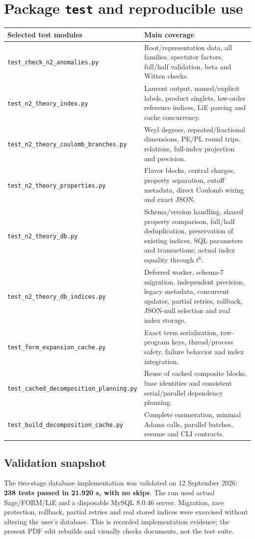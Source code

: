 \documentclass[11pt,a4paper]{article}
\numberwithin{equation}{section}
\newcommand{\code}[1]{{\small\nolinkurl{#1}}}
\begin{document}
\clearpage


\clearpage
\section{Package \texttt{test} and reproducible use}\label{sec:test}
\begingroup\small
{\small
\begin{tabularx}{\textwidth}{@{}p{72mm}Y@{}}
\toprule Selected test modules & Main coverage\\\midrule
\code{test_check_n2_anomalies.py} & Root/representation data, all families,
spectator factors, full/half validation, beta and Witten checks.\\
\code{test_n2_theory_index.py} & Laurent output, named/explicit labels, product
singlets, low-order reference indices, LiE parsing and cache concurrency.\\
\code{test_n2_theory_coulomb_branches.py} & Weyl degrees, repeated/fractional
dimensions, PE/PL round trips, relations, full-index projection and precision.\\
\code{test_n2_theory_properties.py} & Flavor blocks, central charges, property
separation, cutoff metadata, direct Coulomb wiring and exact JSON.\\
\code{test_n2_theory_db.py} & Schema/version handling, shared property comparison,
full/half deduplication, preservation of existing indices, SQL parameters and
transactions; actual index equality through $t^6$.\\
\code{test_n2_theory_db_indices.py} & Deferred worker, schema-7 migration,
independent precision, legacy metadata, concurrent updates, partial retries,
rollback, JSON-null selection and real index storage.\\
\code{test_form_expansion_cache.py} & Exact term serialization, raw-program keys,
thread/process safety, failure behavior and index integration.\\
\code{test_cached_decomposition_planning.py} & Reuse of cached composite blocks,
base identities and consistent serial/parallel dependency planning.\\
\code{test_build_decomposition_cache.py} & Complete enumeration, minimal Adams
calls, parallel batches, resume and CLI contracts.\\\bottomrule
\end{tabularx}}

\subsection{Validation snapshot}
The two-stage database implementation was validated on 12 September 2026:
\textbf{238 tests passed in 21.920 s, with no skips}. The run used actual
Sage/FORM/LiE and a disposable MySQL 8.0.46 server. Migration, race protection,
rollback, partial retries and real stored indices were exercised without
altering the user's database. This is recorded implementation evidence; the
present PDF edit rebuilds and visually checks documents, not the test suite.
\end{document}
